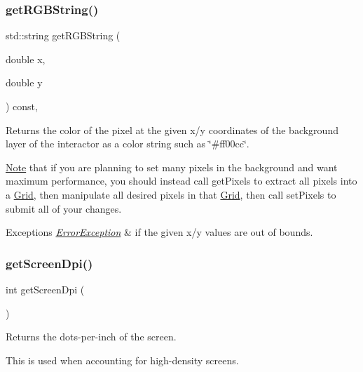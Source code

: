 \subsubsection{\texorpdfstring{get\+R\+G\+B\+String()}{getRGBString()}}
{\footnotesize\ttfamily std\+::string get\+R\+G\+B\+String (\begin{DoxyParamCaption}\item[{double}]{x,  }\item[{double}]{y }\end{DoxyParamCaption}) const\hspace{0.3cm}{\ttfamily [virtual]}, {\ttfamily [inherited]}}



Returns the color of the pixel at the given x/y coordinates of the background layer of the interactor as a color string such as \char`\"{}\#ff00cc\char`\"{}. 

\mbox{\hyperlink{classNote}{Note}} that if you are planning to set many pixels in the background and want maximum performance, you should instead call get\+Pixels to extract all pixels into a \mbox{\hyperlink{classGrid}{Grid}}, then manipulate all desired pixels in that \mbox{\hyperlink{classGrid}{Grid}}, then call set\+Pixels to submit all of your changes.


\begin{DoxyExceptions}{Exceptions}
{\em \mbox{\hyperlink{classErrorException}{Error\+Exception}}} & if the given x/y values are out of bounds. \\
\hline
\end{DoxyExceptions}
\mbox{\label{classGWindow_aea783b75281f864f14e958d2fee28f9d}} 
\subsubsection{\texorpdfstring{get\+Screen\+Dpi()}{getScreenDpi()}}
{\footnotesize\ttfamily int get\+Screen\+Dpi (\begin{DoxyParamCaption}{ }\end{DoxyParamCaption})\hspace{0.3cm}{\ttfamily [static]}}



Returns the dots-\/per-\/inch of the screen. 

This is used when accounting for high-\/density screens. \mbox{\label{classGWindow_ab15179b683630109f0ac256590a3b323}} 
